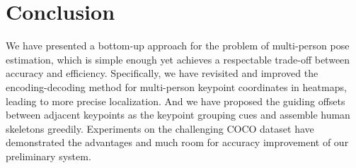 \documentclass{article}
\begin{document}
\section{Conclusion}
We have presented a bottom-up approach for the problem of multi-person pose estimation, which is simple enough yet achieves a respectable trade-off between accuracy and efficiency. Specifically, we have revisited and improved the encoding-decoding method for multi-person keypoint coordinates in heatmaps, leading to more precise localization.  And we have proposed the guiding offsets between adjacent keypoints as the keypoint grouping cues and assemble human skeletons greedily. Experiments on the challenging COCO dataset have demonstrated the advantages and much room for accuracy improvement of our preliminary system.



































\end{document}
